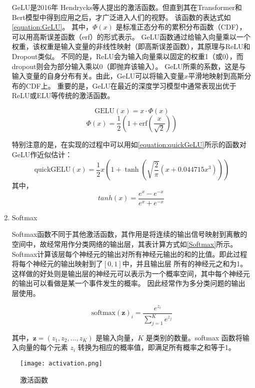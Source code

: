 \begin{enumerate}
  GeLU是2016年 Hendrycks等人提出的激活函数\cite{2016GeLU}。但直到其在Transformer和Bert模型中得到应用之后，才广泛进入人们的视野。
  该函数的表达式如\cref{equation:GeLU}。
  其中，$\Phi(x)$ 是标准正态分布的累积分布函数（CDF），可以用高斯误差函数（erf）的形式表示。
  GeLU函数通过给输入向量乘以一个权重，该权重是输入变量的非线性映射（即高斯误差函数），其原理与ReLU和Dropout类似。
  不同的是，ReLU会为输入向量乘以固定的权重1（或0），而dropout则会为部分输入乘以0（即抛弃该输入）。
  GeLU所乘的系数，这是与输入变量的自身分布有关。由此，GeLU可以将输入变量$x$平滑地映射到高斯分布的CDF上。
  重要的是，GeLU在最近的深度学习模型中通常表现出优于ReLU或ELU等传统的激活函数。

  \begin{equation}
    \label{equation:GeLU}
    \text{GELU}(x) = x \cdot \Phi(x) 
  \end{equation}
   \begin{equation}
    \label{equation:Gauss}
    \Phi(x) = \frac{1}{2} \left(1 + \text{erf} \left(\frac{x}{\sqrt{2}}\right)\right)
  \end{equation}
  
  特别注意的是，在实现的过程中可以用如\cref{equation:quickGeLU}所示的函数对GeLU作近似估计：
  \begin{equation}
    \label{equation:quickGeLU}
    \text{quickGELU}(x) = \frac{1}{2}x\left(1 + \tanh\left(\sqrt{\frac{2}{\pi}}\left(x + 0.044715x^3\right)\right)\right)
  \end{equation}
  其中，
  \begin{equation}
    tanh(x) = \frac{{e^{x} - e^{-x}}}{{e^{x} + e^{-x}}}
\
  \end{equation}

  \item Softmax

  Softmax函数不同于其他激活函数，其作用是将连续的输出信号映射到离散的空间中，故经常用作分类网络的输出层，其表计算方式如\cref{Softmax}所示。
  Softmax计算该层每个神经元的输出对所有神经元输出的和的比值。即此过程将每个神经元的输出映射到了$[0,1]$中，并且输出层
  所有的神经元之和为1。这样做的好处则是输出层的神经元可以表示为一个概率空间，其中每个神经元的输出可以看做是某一个事件发生的概率。
  因此经常作为多分类问题的输出层使用。

\begin{equation}
  \label{softmax}
  \text{softmax}(\mathbf{z})_i = \frac{e^{z_i}}{\sum_{j=1}^{K} e^{z_j}}
\end{equation}

其中，$\mathbf{z} = (z_1, z_2, ..., z_K)$ 是输入向量，$K$ 是类别的数量。softmax 函数将输入向量的每个元素 $z_i$ 转换为相应的概率值，即满足所有概率之和等于1。

\end{enumerate}
\begin{figure}[h]
  \centering
\texttt{[image: activation.png]}
\caption{激活函数}
\label{figure:activation}
  
\end{figure}

